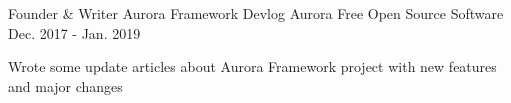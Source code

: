 

\begin{cventries}

  \cventry
    {Founder \& Writer} %
    {Aurora Framework Devlog} %
    {Aurora Free Open Source Software} %
    {Dec. 2017 - Jan. 2019} %
    {
      \begin{cvitems} %
        \item {Wrote some update articles about Aurora Framework project with
          new features and major changes}
      \end{cvitems}
    }

\end{cventries}
